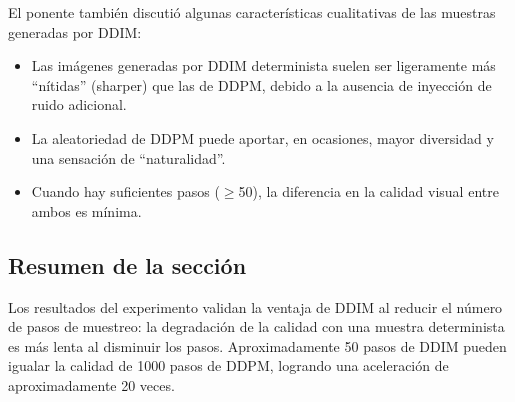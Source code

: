 El ponente también discutió algunas características cualitativas de las muestras generadas por DDIM:

\begin{itemize}
    \item Las imágenes generadas por DDIM determinista suelen ser ligeramente más ``nítidas'' (sharper) que las de DDPM, debido a la ausencia de inyección de ruido adicional.
    \item La aleatoriedad de DDPM puede aportar, en ocasiones, mayor diversidad y una sensación de ``naturalidad''.
    \item Cuando hay suficientes pasos ($\geq$50), la diferencia en la calidad visual entre ambos es mínima.
\end{itemize}

\subsection{Resumen de la sección}

Los resultados del experimento validan la ventaja de DDIM al reducir el número de pasos de muestreo: la degradación de la calidad con una muestra determinista es más lenta al disminuir los pasos. Aproximadamente 50 pasos de DDIM pueden igualar la calidad de 1000 pasos de DDPM, logrando una aceleración de aproximadamente 20 veces.
